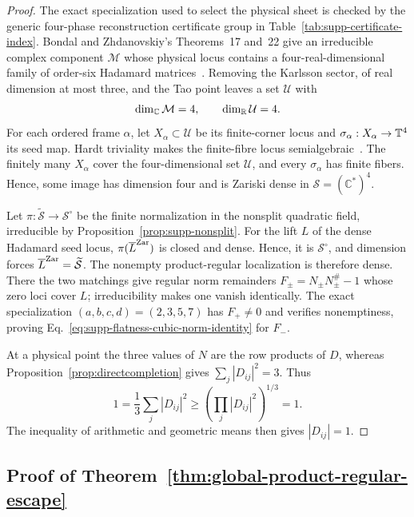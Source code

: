 \begin{proof}
The exact specialization used to select the physical sheet is checked by the generic four-phase reconstruction certificate group in Table~\ref{tab:supp-certificate-index}.
{Bondal and Zhdanovskiy's Theorems~17 and~22 give an irreducible complex component $\mathcal M$ whose physical locus contains a four-real-dimensional family of order-six Hadamard matrices~\MainCiteBondal. Removing the Karlsson sector, of real dimension at most three, and the Tao point leaves a set $\mathcal U$ with}
\begin{equation}
{\dim_{\mathbb C}\mathcal M=4,
\qquad
\dim_{\mathbb R}\mathcal U=4.}
\label{eq:supp-flatness-dimensions}
\end{equation}
{For each ordered frame $\alpha$, let $X_\alpha\subset\mathcal U$ be its finite-corner locus and $\sigma_\alpha:X_\alpha\to\mathbb T^4$ its seed map.  Hardt triviality makes the finite-fibre locus semialgebraic~\MainCiteBasu. The finitely many $X_\alpha$ cover the four-dimensional set $\mathcal U$, and every $\sigma_\alpha$ has finite fibers. Hence, some image has dimension four and is Zariski dense in $\mathcal S=(\mathbb C^*)^4$.}

{Let $\pi:\widetilde{\mathcal S}\to\mathcal S^\circ$ be the finite normalization in the nonsplit quadratic field, irreducible by Proposition~\ref{prop:supp-nonsplit}. For the lift $L$ of the dense Hadamard seed locus, $\pi(\overline L^{\rm Zar})$ is closed and dense. Hence, it is $\mathcal S^\circ$, and dimension forces $\overline L^{\rm Zar}=\widetilde{\mathcal S}$. The nonempty product-regular localization is therefore dense. There the two matchings give regular norm remainders $F_\pm=N_\pm N_\pm^\#-1$ whose zero loci cover $L$; irreducibility makes one vanish identically. The exact specialization $(a,b,c,d)=(2,3,5,7)$ has $F_+\ne0$ and verifies nonemptiness, proving Eq.~\eqref{eq:supp-flatness-cubic-norm-identity} for $F_-$.}

{At a physical point the three values of $N$ are the row products of $D$, whereas Proposition~\ref{prop:directcompletion} gives $\sum_j|D_{ij}|^2=3$.  Thus}
\begin{equation}
{1=\frac13\sum_j|D_{ij}|^2\ge
\left(\prod_j|D_{ij}|^2\right)^{1/3}=1.}
\end{equation}
{The inequality of arithmetic and geometric means then gives $|D_{ij}|=1$.}
\end{proof}

\subsection{{Proof of Theorem~\ref{thm:global-product-regular-escape}}}
\label{sec:supp-product-escape}

